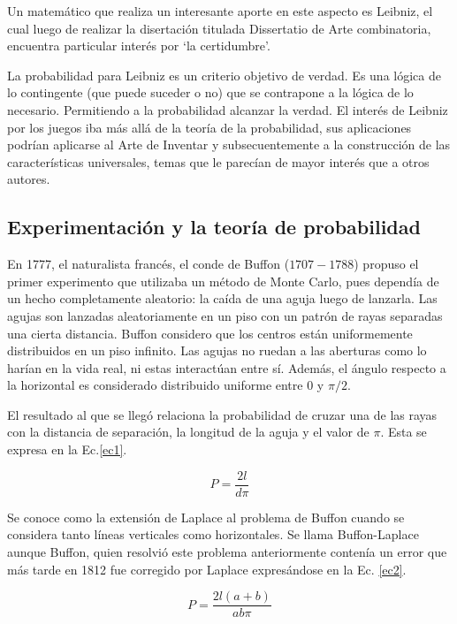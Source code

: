 \documentclass{rbf}
\begin{document}
Un matemático que realiza un interesante aporte en este aspecto es Leibniz, el cual luego de realizar la disertación titulada Dissertatio de Arte combinatoria, encuentra particular interés por ‘la certidumbre’.

La probabilidad para Leibniz es un criterio objetivo de verdad. Es una lógica de lo contingente (que puede suceder o no) que se contrapone a la lógica de lo necesario. Permitiendo a la probabilidad alcanzar la verdad. El interés de Leibniz por los juegos iba más allá de la teoría de la probabilidad, sus aplicaciones podrían aplicarse al Arte de Inventar y subsecuentemente a la construcción de las características universales, temas que le parecían de mayor interés que a otros autores.\cite{charles}

\subsection{Experimentación y la teoría de probabilidad}

En 1777, el naturalista francés, el conde de Buffon ($1707-1788$) propuso el primer experimento que utilizaba un método de Monte Carlo, pues dependía de un hecho completamente aleatorio: la caída de una aguja luego de lanzarla. Las agujas son lanzadas aleatoriamente en un piso con un patrón de rayas separadas una cierta distancia. Buffon considero que los centros están uniformemente distribuidos en un piso infinito. Las agujas no ruedan a las aberturas como lo harían en la vida real, ni estas interactúan entre sí. Además, el ángulo respecto a la horizontal es considerado distribuido uniforme entre 0 y $\pi/2$.

El resultado al que se llegó relaciona la probabilidad de cruzar una de las rayas con la distancia de separación, la longitud de la aguja y el valor de $\pi$. Esta se expresa en la Ec.\ref{ec1}.

\begin{equation}\label{ec1}
    P=\frac{2l}{d\pi}
\end{equation}

Se conoce como la extensión de Laplace al problema de Buffon cuando se considera tanto líneas verticales como horizontales. Se llama Buffon-Laplace aunque Buffon, quien resolvió este problema anteriormente contenía un error que más tarde en 1812 fue corregido por Laplace expresándose en la Ec. \ref{ec2}.

\begin{equation}\label{ec2}
    P=\frac{2l(a+b)}{ab\pi}
\end{equation}
\end{document}
